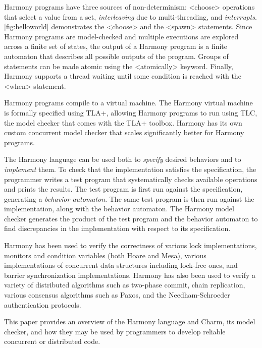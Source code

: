 \documentclass[twocolumn]{article}
\begin{document}
Harmony programs have three sources of non-determinism:
<{choose}> operations that select a value from a set,
\emph{interleaving} due to multi-threading, and \emph{interrupts}.
\autoref{fig:helloworld} demonstrates the <{choose}> and the <{spawn}>
statements.  Since Harmony programs are model-checked and multiple
executions are explored across a finite set of states, the output of a
Harmony program is a finite automaton that describes all possible
outputs of the program.  Groups of statements can be made atomic
using the <{atomically}> keyword.  Finally, Harmony supports a thread
waiting until some condition is reached with the <{when}> statement.

Harmony programs compile to a virtual machine.  The Harmony virtual
machine is formally specified using TLA+, allowing Harmony programs
to run using TLC, the model checker that comes with the TLA+
toolbox.  Harmony has its own custom concurrent model checker that
scales significantly better for Harmony programs.

The Harmony language can be used both to \emph{specify} desired
behaviors and to \emph{implement} them.  To check that the implementation
satisfies the specification, the programmer writes a test program that
systematically checks available operations and prints the results.
The test program is first run against the specification, generating
a \emph{behavior automaton}.  The same test program is then run
against the implementation, along with the behavior automaton.
The Harmony model checker generates the product of the test program
and the behavior automaton to find discrepancies in the implementation
with respect to its specification.

Harmony has been used to verify the correctness of various lock
implementations, monitors and condition variables (both Hoare and Mesa),
various implementations of concurrent data structures including lock-free
ones, and barrier synchronization implementations.  Harmony has also been
used to verify a variety of distributed algorithms such as two-phase
commit, chain replication, various consensus algorithms such as Paxos,
and the Needham-Schroeder authentication protocols.

This paper provides an overview of the Harmony language and Charm,
its model checker, and how they may be used by programmers to
develop reliable concurrent or distributed code.
\end{document}

